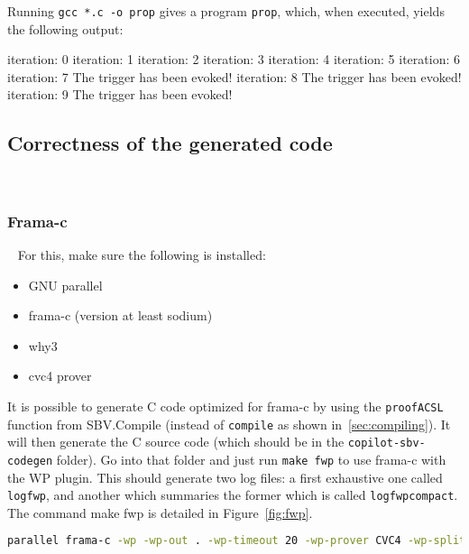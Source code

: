 Running {\tt gcc *.c -o prop} gives a program {\tt prop}, which,
when executed, yields the following output:
%
\begin{code}
iteration: 0
iteration: 1
iteration: 2
iteration: 3
iteration: 4
iteration: 5
iteration: 6
iteration: 7
The trigger has been evoked!
iteration: 8
The trigger has been evoked!
iteration: 9
The trigger has been evoked!
\end{code}
%

\subsection{Correctness of the generated code}~\label{sec:correctness}

\subsubsection{Frama-c}~\label{subsec:frama-c}
For this, make sure the following is installed:

\begin{itemize}
	\item GNU parallel
	\item frama-c (version at least sodium)
	\item why3
	\item cvc4 prover
\end{itemize}

It is possible to generate C code optimized for frama-c by using the \texttt{proofACSL}
function from SBV.Compile (instead of \texttt{compile} as shown
in~\ref{sec:compiling}). It will then generate the C source code (which should be in
the \texttt{copilot-sbv-codegen} folder). Go into that folder and just run
\texttt{make fwp} to use frama-c with the WP plugin. This should generate two
log files: a first exhaustive one called \texttt{logfwp}, and another which
summaries the former which is called \texttt{logfwpcompact}. The command make
fwp is detailed in Figure~\ref{fig:fwp}.

\begin{figure*}[!htb]
	\begin{lstlisting}[frame=none, language=bash]
parallel frama-c -wp -wp-out . -wp-timeout 20 -wp-prover CVC4 -wp-split {} ::: *.c | tee >logfwp >(grep 'Proved\|Unknown\|Timeout\|Failed\|Qed:\s\|CVC4:\s\|Parsing .*\.c' > logfwpcompact) >(grep 'Proved\|Qed:\s\|CVC4:\s\|Unknown\|Timeout\|Failed\|Parsing .*\.c')

	\end{lstlisting}
	\caption{The bash command.}
	\label{fig:fwp}
\end{figure*}

